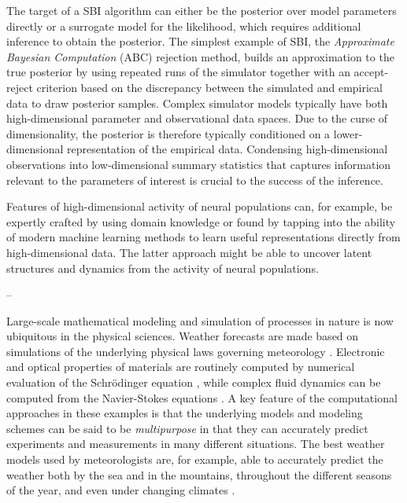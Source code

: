 The target of a SBI algorithm can either be the posterior over model parameters directly or a surrogate model for the likelihood, which requires additional inference to obtain the posterior. The simplest example of SBI, the \textit{Approximate Bayesian Computation} (ABC) rejection method, builds an approximation to the true posterior by using repeated runs of the simulator together with an accept-reject criterion based on the discrepancy between the simulated and empirical data to draw posterior samples. Complex simulator models typically have both high-dimensional parameter and observational data spaces. Due to the curse of dimensionality, the posterior is therefore typically conditioned on a lower-dimensional representation of the empirical data. Condensing high-dimensional observations into low-dimensional summary statistics that captures information relevant to the parameters of interest is crucial to the success of the inference.

Features of high-dimensional activity of neural populations can, for example, be expertly crafted by using domain knowledge or found by tapping into the ability of modern machine learning methods to learn useful representations directly from high-dimensional data. The latter approach might be able to uncover latent structures and dynamics from the activity of neural populations.

--

Large-scale mathematical modeling and simulation of processes in nature is now ubiquitous in the physical sciences. Weather forecasts are made based on simulations of the underlying physical laws governing meteorology \cite{Bauer_2015}. Electronic and optical properties of materials are routinely computed by numerical evaluation of the Schrödinger equation \cite{Giustino_2014}, while complex fluid dynamics can be computed from the Navier-Stokes equations \cite{Tu_2007}. A key feature of the computational approaches in these examples is that the underlying models and modeling schemes can be said to be \textit{multipurpose} in that they can accurately predict experiments and measurements in many different situations. The best weather models used by meteorologists are, for example, able to accurately predict the weather both by the sea and in the mountains, throughout the different seasons of the year, and even under changing climates \cite{Bauer_2015}.

